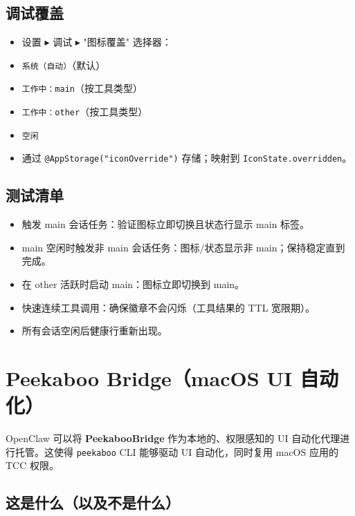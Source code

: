 \subsection{调试覆盖}


\begin{itemize}
  \item 设置 ▸ 调试 ▸ "图标覆盖" 选择器：
  \item \texttt{系统（自动）}（默认）
  \item \texttt{工作中：main}（按工具类型）
  \item \texttt{工作中：other}（按工具类型）
  \item \texttt{空闲}
  \item 通过 \texttt{@AppStorage("iconOverride")} 存储；映射到 \texttt{IconState.overridden}。
\end{itemize}


\subsection{测试清单}


\begin{itemize}
  \item 触发 main 会话任务：验证图标立即切换且状态行显示 main 标签。
  \item main 空闲时触发非 main 会话任务：图标/状态显示非 main；保持稳定直到完成。
  \item 在 other 活跃时启动 main：图标立即切换到 main。
  \item 快速连续工具调用：确保徽章不会闪烁（工具结果的 TTL 宽限期）。
  \item 所有会话空闲后健康行重新出现。
\end{itemize}



\clearpage

\section{Peekaboo Bridge（macOS UI 自动化）}


OpenClaw 可以将 \textbf{PeekabooBridge} 作为本地的、权限感知的 UI 自动化代理进行托管。这使得 \texttt{peekaboo} CLI 能够驱动 UI 自动化，同时复用 macOS 应用的 TCC 权限。

\subsection{这是什么（以及不是什么）}


